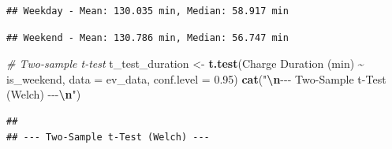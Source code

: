 \documentclass[
  12pt,
]{article}
\newenvironment{Shaded}{\begin{snugshade}}{\end{snugshade}}
\newcommand{\AttributeTok}[1]{\textcolor[rgb]{0.13,0.29,0.53}{#1}}
\newcommand{\CommentTok}[1]{\textcolor[rgb]{0.56,0.35,0.01}{\textit{#1}}}
\newcommand{\DecValTok}[1]{\textcolor[rgb]{0.00,0.00,0.81}{#1}}
\newcommand{\FloatTok}[1]{\textcolor[rgb]{0.00,0.00,0.81}{#1}}
\newcommand{\FunctionTok}[1]{\textcolor[rgb]{0.13,0.29,0.53}{\textbf{#1}}}
\newcommand{\NormalTok}[1]{#1}
\newcommand{\OtherTok}[1]{\textcolor[rgb]{0.56,0.35,0.01}{#1}}
\newcommand{\SpecialCharTok}[1]{\textcolor[rgb]{0.81,0.36,0.00}{\textbf{#1}}}
\newcommand{\StringTok}[1]{\textcolor[rgb]{0.31,0.60,0.02}{#1}}
\begin{document}
\begin{verbatim}
## Weekday - Mean: 130.035 min, Median: 58.917 min
\end{verbatim}

\begin{Shaded}
\end{Shaded}

\begin{verbatim}
## Weekend - Mean: 130.786 min, Median: 56.747 min
\end{verbatim}

\begin{Shaded}
\begin{Highlighting}[]
\CommentTok{\# Two{-}sample t{-}test}
\NormalTok{t\_test\_duration }\OtherTok{\textless{}{-}} \FunctionTok{t.test}\NormalTok{(}\StringTok{\textasciigrave{}}\AttributeTok{Charge Duration (min)}\StringTok{\textasciigrave{}} \SpecialCharTok{\textasciitilde{}}\NormalTok{ is\_weekend,}
    \AttributeTok{data =}\NormalTok{ ev\_data, }\AttributeTok{conf.level =} \FloatTok{0.95}\NormalTok{)}
\FunctionTok{cat}\NormalTok{(}\StringTok{"}\SpecialCharTok{\textbackslash{}n}\StringTok{{-}{-}{-} Two{-}Sample t{-}Test (Welch) {-}{-}{-}}\SpecialCharTok{\textbackslash{}n}\StringTok{"}\NormalTok{)}
\end{Highlighting}
\end{Shaded}

\begin{verbatim}
## 
## --- Two-Sample t-Test (Welch) ---
\end{verbatim}

\begin{Shaded}
\end{Shaded}
\end{document}
